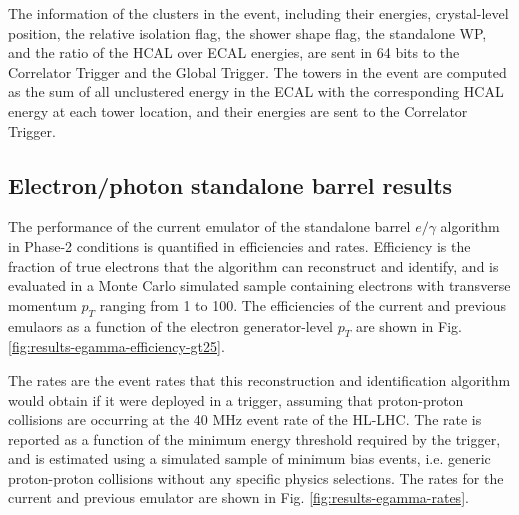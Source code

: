 The information of the clusters in the event, including their energies, crystal-level position, the relative isolation flag, the shower shape flag, the standalone WP, and the ratio of the HCAL over ECAL energies, are sent in 64 bits to the Correlator Trigger and the Global Trigger. The towers in the event are computed as the sum of all unclustered energy in the ECAL with the corresponding HCAL energy at each tower location, and their energies are sent to the Correlator Trigger.

\subsection{Electron/photon standalone barrel results}
The performance of the current emulator of the standalone barrel $e/\gamma$ algorithm in Phase-2 conditions is quantified in efficiencies and rates. Efficiency is the fraction of true electrons that the algorithm can reconstruct and identify, and is evaluated in a Monte Carlo simulated sample containing electrons with transverse momentum $p_{T}$ ranging from 1 to 100\GeV.  The efficiencies of the current and previous emulaors as a function of the electron generator-level $p_{T}$ are shown in Fig. \ref{fig:results-egamma-efficiency-gt25}. 

The rates are the event rates that this reconstruction and identification algorithm would obtain if it were deployed in a trigger, assuming that proton-proton collisions are occurring at the 40 MHz event rate of the HL-LHC. The rate is reported as a function of the minimum energy threshold required by the trigger, and is estimated using a simulated sample of minimum bias events, i.e. generic proton-proton collisions without any specific physics selections. The rates for the current and previous emulator are shown in Fig. \ref{fig:results-egamma-rates}. 

